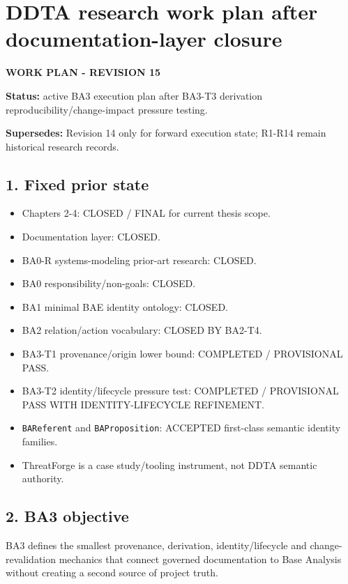 \documentclass[11pt,a4paper]{article}
\providecommand{\tightlist}{\setlength{\itemsep}{0pt}\setlength{\parskip}{0pt}}
\begin{document}
\section{DDTA research work plan after documentation-layer
closure}\label{ddta-research-work-plan-after-documentation-layer-closure}

\textbf{WORK PLAN - REVISION 15}

\textbf{Status:} active BA3 execution plan after BA3-T3 derivation
reproducibility/change-impact pressure testing.

\textbf{Supersedes:} Revision 14 only for forward execution state;
R1-R14 remain historical research records.

\subsection{1. Fixed prior state}\label{fixed-prior-state}

\begin{itemize}
\tightlist
\item
  Chapters 2-4: CLOSED / FINAL for current thesis scope.
\item
  Documentation layer: CLOSED.
\item
  BA0-R systems-modeling prior-art research: CLOSED.
\item
  BA0 responsibility/non-goals: CLOSED.
\item
  BA1 minimal BAE identity ontology: CLOSED.
\item
  BA2 relation/action vocabulary: CLOSED BY BA2-T4.
\item
  BA3-T1 provenance/origin lower bound: COMPLETED / PROVISIONAL PASS.
\item
  BA3-T2 identity/lifecycle pressure test: COMPLETED / PROVISIONAL PASS
  WITH IDENTITY-LIFECYCLE REFINEMENT.
\item
  \texttt{BAReferent} and \texttt{BAProposition}: ACCEPTED first-class
  semantic identity families.
\item
  ThreatForge is a case study/tooling instrument, not DDTA semantic
  authority.
\end{itemize}

\subsection{2. BA3 objective}\label{ba3-objective}

BA3 defines the smallest provenance, derivation, identity/lifecycle and
change-revalidation mechanics that connect governed documentation to
Base Analysis without creating a second source of project truth.
\end{document}
